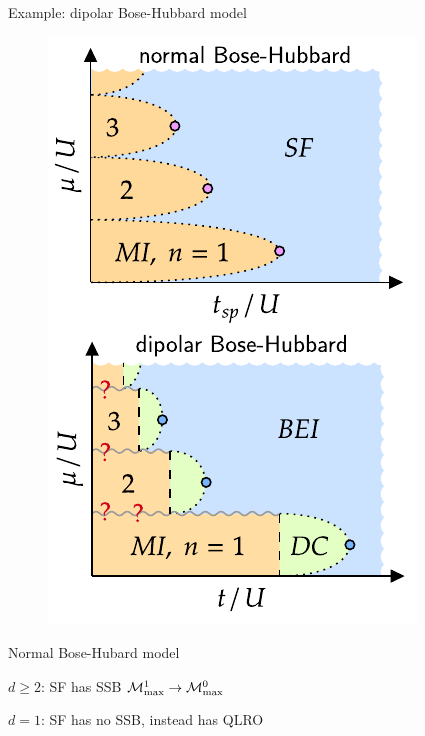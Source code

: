 \documentclass{beamer}
\newcommand{\M}[1]{\mathcal{M}_{\rm max}^{#1}}
\begin{document}
\begin{frame}[t]{Example: dipolar Bose-Hubbard model}
\begin{figure}
	\includegraphics[scale=.8]{dbhm}
\end{figure}
Normal Bose-Hubard model

\setlength{\leftskip}{1cm}

$d\ge 2$: SF has SSB $\M{1} \rightarrow \M{0}$

$d=1$: SF has no SSB, instead has QLRO
\end{frame}
\end{document}
